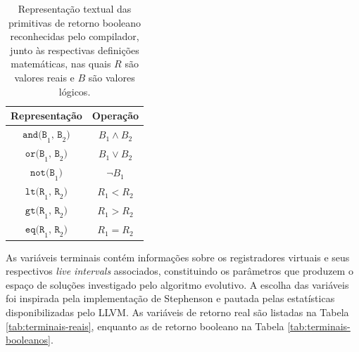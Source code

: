 \documentclass[
	12pt,				%
	openright,			%
	twoside,			%
	a4paper,			%
	tcc,			%
	]{ABNT-DC-UEL}
\begin{document}
\begin{table}[htb]
    \centering
    \begin{tabular}{cc}
        \hline
        \textbf{Representação} & \textbf{Operação} \\
        \hline
        $\texttt{and(B}_1\texttt{, B}_2\texttt{)}$ & $B_1 \land B_2$ \\
        $\texttt{or(B}_1\texttt{, B}_2\texttt{)}$ & $B_1 \lor B_2$ \\
        $\texttt{not(B}_1\texttt{)}$ & $\lnot B_1$ \\
        $\texttt{lt(R}_1\texttt{, R}_2\texttt{)}$ & $R_1 < R_2$ \\
        $\texttt{gt(R}_1\texttt{, R}_2\texttt{)}$ & $R_1 > R_2$ \\
        $\texttt{eq(R}_1\texttt{, R}_2\texttt{)}$ & $R_1 = R_2$ \\
        \hline
    \end{tabular}
    \caption{Representação textual das primitivas de retorno booleano reconhecidas pelo compilador, junto às respectivas definições matemáticas, nas quais $R$ são valores reais e $B$ são valores lógicos.}
    \label{tab:primitivas-booleanas}
\end{table}

As variáveis terminais contém informações sobre os registradores virtuais e seus respectivos \textit{live intervals} associados, constituindo os parâmetros que produzem o espaço de soluções investigado pelo algoritmo evolutivo. A escolha das variáveis foi inspirada pela implementação de Stephenson \cite{stephenson:06} e pautada pelas estatísticas disponibilizadas pelo LLVM. As variáveis de retorno real são listadas na Tabela \ref{tab:terminais-reais}, enquanto as de retorno booleano na Tabela \ref{tab:terminais-booleanos}.
\end{document}
